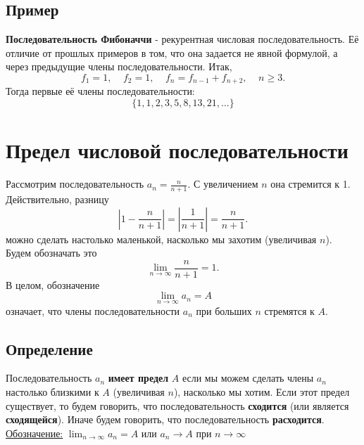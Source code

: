 \documentclass[11pt,a4paper]{article}
\begin{document}
\subsection{Пример}
    \textbf{Последовательность Фибоначчи} - рекурентная числовая последовательность. Её отличие от прошлых примеров в том, что она задается не явной формулой, а через предыдущие члены последовательности. Итак,
    \begin{equation*}
        f_1 = 1, \;\;\;\; f_2 = 1, \;\;\;\; f_n = f_{n-1} + f_{n+2}, \;\;\;\; n \geq 3.
    \end{equation*}
    Тогда первые её члены последовательности:
    \begin{equation*}
        \{1,1,2,3,5,8,13,21, \dots\}
    \end{equation*}
    
\newpage
\section{Предел числовой последовательности}
    Рассмотрим последовательность $a_n = \frac{n}{n+1}$. С увеличением $n$ она стремится к 1. Действительно, разницу
    \begin{equation*}
        \left|1 - \frac{n}{n+1}\right| = \left|\frac{1}{n+1}\right| = \frac{n}{n+1}.
    \end{equation*}
    можно сделать настолько маленькой, насколько мы захотим (увеличивая $n$). Будем обозначать это
    \begin{equation*}
        \lim_{n \to \infty} \frac{n}{n+1} = 1.
    \end{equation*}
    В целом, обозначение
    \begin{equation*}
        \lim_{n \to \infty} a_n = A
    \end{equation*}
    означает, что члены последовательности $a_n$ при больших $n$ стремятся к $A$.
\subsection{Определение}
    Последовательность $a_n$ \textbf{имеет предел} $A$ если мы можем сделать члены $a_n$ настолько близкими к $A$ (увеличивая $n$), насколько мы хотим.
    Если этот предел существует, то будем говорить, что последовательность \textbf{сходится} (или является \textbf{сходящейся}). Иначе будем говорить, что последовательность \textbf{расходится}.\\
    \underline{Обозначение:} $\displaystyle\lim_{n \to \infty} a_n = A$ или $a_n \to A$ при $n \to \infty$
    
\end{document}

